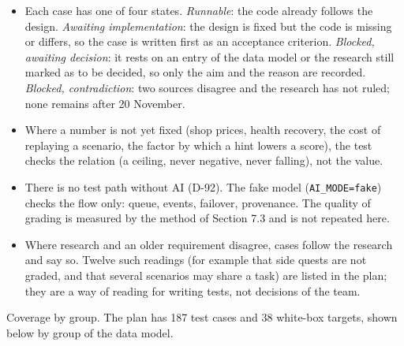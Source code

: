 \begin{itemize}[leftmargin=1.5em]
  \item Each case has one of four states. \textit{Runnable}: the code already follows the design. \textit{Awaiting implementation}: the design is fixed but the code is missing or differs, so the case is written first as an acceptance criterion. \textit{Blocked, awaiting decision}: it rests on an entry of the data model or the research still marked as to be decided, so only the aim and the reason are recorded. \textit{Blocked, contradiction}: two sources disagree and the research has not ruled; none remains after 20 November.
  \item Where a number is not yet fixed (shop prices, health recovery, the cost of replaying a scenario, the factor by which a hint lowers a score), the test checks the relation (a ceiling, never negative, never falling), not the value.
  \item There is no test path without AI (D-92). The fake model (\texttt{AI\_\allowbreak{}MODE=fake}) checks the flow only: queue, events, failover, provenance. The quality of grading is measured by the method of Section 7.3 and is not repeated here.
  \item Where research and an older requirement disagree, cases follow the research and say so. Twelve such readings (for example that side quests are not graded, and that several scenarios may share a task) are listed in the plan; they are a way of reading for writing tests, not decisions of the team.
\end{itemize}

Coverage by group. The plan has 187 test cases and 38 white-box targets, shown below by group of the data model.


